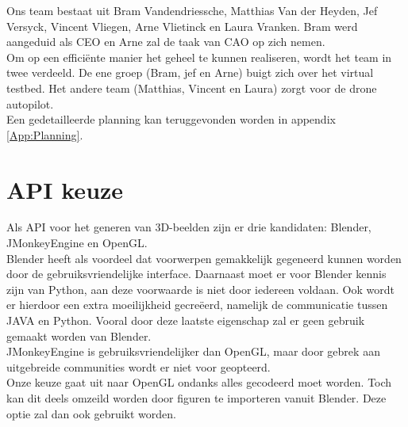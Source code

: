 \documentclass{peno-opdracht1}
\begin{document}
\maketitle

\noindent
	Ons team bestaat uit Bram Vandendriessche, Matthias Van der Heyden, Jef Versyck, Vincent Vliegen, Arne Vlietinck en Laura Vranken. Bram werd aangeduid als CEO en Arne zal de taak van CAO op zich nemen. \\
	Om op een effici\"ente manier het geheel te kunnen realiseren, wordt het team in twee verdeeld. De ene groep (Bram, jef en Arne) buigt zich over het virtual testbed. Het andere team  (Matthias, Vincent en Laura) zorgt voor de drone autopilot.\\
	Een gedetailleerde planning kan teruggevonden worden in appendix \ref{App:Planning}.

\section{API keuze}
Als API voor het generen van 3D-beelden zijn er drie kandidaten: Blender, JMonkeyEngine en OpenGL.\\
Blender heeft als voordeel dat voorwerpen gemakkelijk gegeneerd kunnen worden door de gebruiksvriendelijke interface. Daarnaast moet er voor Blender kennis zijn van Python, aan deze voorwaarde is niet door iedereen voldaan. Ook wordt er hierdoor een extra moeilijkheid gecre\"eerd, namelijk de \mbox{communicatie} tussen JAVA en Python. Vooral door deze laatste eigenschap zal er geen gebruik gemaakt worden van Blender. \\
JMonkeyEngine is gebruiksvriendelijker dan OpenGL, maar door gebrek aan uitgebreide communities wordt er niet voor geopteerd.\\
Onze keuze gaat uit naar OpenGL ondanks alles gecodeerd moet worden. Toch kan dit deels omzeild worden door figuren te importeren vanuit Blender. Deze optie zal dan ook gebruikt worden. 
\end{document}
